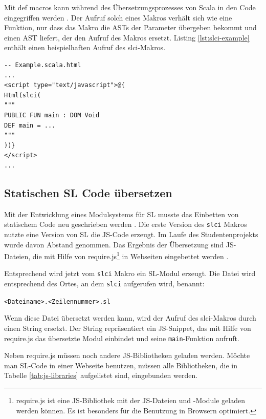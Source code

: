\documentclass[12pt,bibtotoc]{scrreprt}
\begin{document}
Mit def macros kann während des Übersetzungsprozesses von Scala in den Code eingegriffen werden \cite{EPFL2}. Der Aufruf solch eines Makros verhält sich wie eine Funktion, nur dass das Makro die \ac{AST}s der Parameter übergeben bekommt und einen \ac{AST} liefert, der den Aufruf des Makros ersetzt. Listing \ref{lst:slci-example} enthält einen beispielhaften Aufruf des slci-Makros.

\begin{lstlisting}[caption={Beispielaufruf des slci-Makros in einer Play View}, label=lst:slci-example, float=h]
-- Example.scala.html
...
<script type="text/javascript">@{
Html(slci(
"""
PUBLIC FUN main : DOM Void
DEF main = ...
"""
))}
</script>
...
\end{lstlisting}

\subsection{Statischen SL Code übersetzen}
\label{subsec:compile-static-sl}

Mit der Entwicklung eines Modulsystems für \ac{SL} musste das Einbetten von statischem Code neu geschrieben werden \cite{Bisping2013}. Die erste Version des \lstinline!slci! Makros nutzte eine Version von \ac{SL} die \ac{JS}-Code erzeugt. Im Laufe des Studentenprojekts wurde davon Abstand genommen. Das Ergebnis der Übersetzung sind \ac{JS}-Dateien, die mit Hilfe von require.js\footnote{require.js ist eine JS-Bibliothek mit der JS-Dateien und -Module geladen werden können. Es ist besonders für die Benutzung in Browsern optimiert.} in Webseiten eingebettet werden \cite{RequireJS1}.

Entsprechend wird jetzt vom \lstinline!slci! Makro ein \ac{SL}-Modul erzeugt. Die Datei wird entsprechend des Ortes, an dem \lstinline!slci! aufgerufen wird, benannt:
\begin{center}
\lstinline!<Dateiname>.<Zeilennummer>.sl!
\end{center}
Wenn diese Datei übersetzt werden kann, wird der Aufruf des slci-Makros durch einen String ersetzt. Der String repräsentiert ein JS-Snippet, das mit Hilfe von require.js das übersetzte Modul einbindet und seine \lstinline!main!-Funktion aufruft.

Neben require.js müssen noch andere \ac{JS}-Bibliotheken geladen werden. Möchte man \ac{SL}-Code in einer Webseite benutzen, müssen alle Bibliotheken, die in Tabelle \ref{tab:js-libraries} aufgelistet sind, eingebunden werden.
\end{document}

